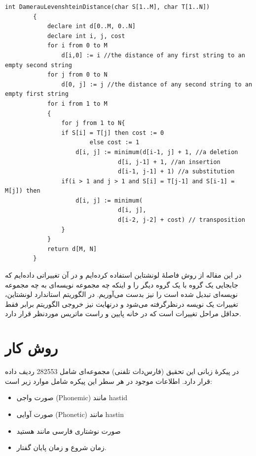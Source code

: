 \documentclass[12pt,onecolumn,a4paper]{article}
\begin{document}
    \begin{LTR}
        \begin{lstlisting}[style=C++Style,caption=\rl{شبه‌کد فاصلۀ دامرو-لونشتاین}, label={listing:3}]
        int DamerauLevenshteinDistance(char S[1..M], char T[1..N])
        {
            declare int d[0..M, 0..N]
            declare int i, j, cost
            for i from 0 to M
                d[i,0] := i //the distance of any first string to an empty second string
            for j from 0 to N
                d[0, j] := j //the distance of any second string to an empty first string
            for i from 1 to M
            {
                for j from 1 to N{
                if S[i] = T[j] then cost := 0
                        else cost := 1
                    d[i, j] := minimum(d[i-1, j] + 1, //a deletion
                                d[i, j-1] + 1, //an insertion
                                d[i-1, j-1] + 1) //a substitution
                if(i > 1 and j > 1 and S[i] = T[j-1] and S[i-1] = M[j]) then
                    d[i, j] := minimum(
                                d[i, j],
                                d[i-2, j-2] + cost) // transposition
                }
            }
            return d[M, N]
        }
        \end{lstlisting}
    \end{LTR}

    \par
    در این مقاله از روش فاصلۀ لونشتاین استفاده کرده‌ایم و در آن تغییراتی داده‌ایم که جابجایی یک گروه با یک گروه دیگر را و اینکه چه مجموعه نویسه‌ای به چه مجموعه نویسه‌ای تبدیل شده‌ است را نیز بدست می‌آوریم. در الگوریتم استاندارد لونشتاین، تغییرات یک نویسه درنظرگرفته می‌شود و درنهایت نیز خروجی الگوریتم برابر فقط حداقل مراحل تغییرات است که در خانه پایین و راست ماتریس موردنظر قرار دارد.

    \section{روش کار}
    در پیکرهٔ زبانی این تحقیق (فارس‌دات تلفنی) مجموعه‌ای شامل 282553 ردیف داده قرار دارد. اطلاعات موجود در هر سطر این پیکره شامل موارد زیر است:

    \begin{itemize}
        \item صورت واجی (Phonemic) مانند hastid
        \item صورت آوایی (Phonetic) مانند hastin
        \item صورت نوشتاری فارسی مانند هستید
        \item زمان شروع و زمان پایان گفتار.
    \end{itemize}
\end{document}
